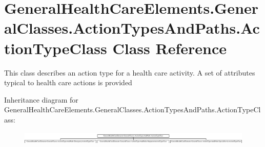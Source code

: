 \hypertarget{class_general_health_care_elements_1_1_general_classes_1_1_action_types_and_paths_1_1_action_type_class}{}\section{General\+Health\+Care\+Elements.\+General\+Classes.\+Action\+Types\+And\+Paths.\+Action\+Type\+Class Class Reference}
\label{class_general_health_care_elements_1_1_general_classes_1_1_action_types_and_paths_1_1_action_type_class}


This class describes an action type for a health care activity. A set of attributes typical to health care actions is provided  


Inheritance diagram for General\+Health\+Care\+Elements.\+General\+Classes.\+Action\+Types\+And\+Paths.\+Action\+Type\+Class\+:\begin{figure}[H]
\begin{center}
\leavevmode
\includegraphics[height=0.638177cm]{class_general_health_care_elements_1_1_general_classes_1_1_action_types_and_paths_1_1_action_type_class}
\end{center}
\end{figure}
